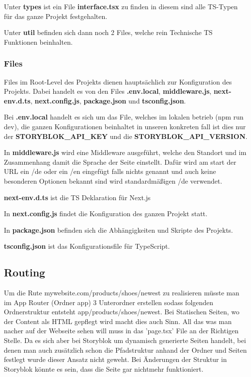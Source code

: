 Unter \textbf{types} ist ein File \textbf{interface.tsx} zu finden in diesem sind alle TS-Typen für das ganze Projekt festgehalten.

Unter \textbf{util} befinden sich dann noch 2 Files, welche rein Technische TS Funktionen beinhalten.

\subsubsection*{Files}
Files im Root-Level des Projekts dienen hauptsächlich zur Konfiguration des Projekts. Dabei handelt es von den Files \textbf{.env.local}, \textbf{middleware.js}, \textbf{next-env.d.ts}, \textbf{next.config.js}, \textbf{package.json} und \textbf{tsconfig.json}.

Bei \textbf{.env.local} handelt es sich um das File, welches im lokalen betrieb (npm run dev), die ganzen Konfigurationen beinhaltet in unseren konkreten fall ist dies nur der \textbf{STORYBLOK\_API\_KEY} und die \textbf{STORYBLOK\_API\_VERSION}.

In \textbf{middleware.js} wird eine Middleware ausgeführt, welche den Standort und im Zusammenhang damit die Sprache der Seite einstellt. Dafür wird am start der URL ein /de oder ein /en eingefügt falls nichts genannt und auch keine besonderen Optionen bekannt sind wird standardmäßigen /de verwendet.

\textbf{next-env.d.ts} ist die TS Deklaration für Next.js

In \textbf{next.config.js} findet die Konfiguration des ganzen Projekt statt.

In \textbf{package.json} befinden sich die Abhängigkeiten und Skripte des Projekts.

\textbf{tsconfig.json} ist das Konfigurationsfile für TypeScript.

\subsection{Routing}
Um die Rute mywebsite.com/products/shoes/newest zu realisieren müsste man im App Router (Ordner app) 3 Unterordner erstellen sodass folgenden Ordnerstruktur entsteht app/products/shoes/newest. Bei Statischen Seiten, wo der Content als HTML gepflegt wird macht dies auch Sinn. All das was man nacher auf der Webseite sehen will muss in das 'page.tsx' File an der Richtigen Stelle. 
Da es sich aber bei Storyblok um dynamisch generierte Seiten handelt, bei denen man auch zusätzlich schon die Pfadstruktur anhand der Ordner und Seiten festlegt wurde dieser Ansatz nicht geweht. Bei Änderungen der Struktur in Storyblok könnte es sein, dass die Seite gar nichtmehr funktioniert. 

